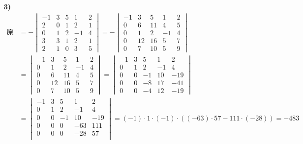 \begin{problem}
\begin{solution}
\begin{enumerate}
			\item[\textbf{3)}]
			$$
			\begin{aligned}
				\text{原式} & = -\begin{vmatrix}
					-1 & 3 & 5 & 1 & 2 \\
					2 & 0 & 1 & 2 & 1 \\
					0 & 1 & 2 & -1 & 4 \\
					3 & 3 & 1 & 2 & 1 \\
					2 & 1 & 0 & 3 & 5
				\end{vmatrix} = -\begin{vmatrix}
					-1 & 3 & 5 & 1 & 2 \\
					0 & 6 & 11 & 4 & 5 \\
					0 & 1 & 2 & -1 & 4 \\
					0 & 12 & 16 & 5 & 7 \\
					0 & 7 & 10 & 5 & 9
				\end{vmatrix} \\
				& = \begin{vmatrix}
					-1 & 3 & 5 & 1 & 2 \\
					0 & 1 & 2 & -1 & 4 \\
					0 & 6 & 11 & 4 & 5 \\
					0 & 12 & 16 & 5 & 7 \\
					0 & 7 & 10 & 5 & 9
				\end{vmatrix} = \begin{vmatrix}
					-1 & 3 & 5 & 1 & 2 \\
					0 & 1 & 2 & -1 & 4 \\
					0 & 0 & -1 & 10 & -19 \\
					0 & 0 & -8 & 17 & -41 \\
					0 & 0 & -4 & 12 & -19
				\end{vmatrix} \\
				& = \begin{vmatrix}
					-1 & 3 & 5 & 1 & 2 \\
					0 & 1 & 2 & -1 & 4 \\
					0 & 0 & -1 & 10 & -19 \\
					0 & 0 & 0 & -63 & 111 \\
					0 & 0 & 0 & -28 & 57 \\
				\end{vmatrix} = (-1) \cdot 1 \cdot (-1) \cdot ((-63) \cdot 57 - 111 \cdot (-28)) = -483
			\end{aligned}
			$$
		\end{enumerate}
	\end{solution}
\end{problem}

